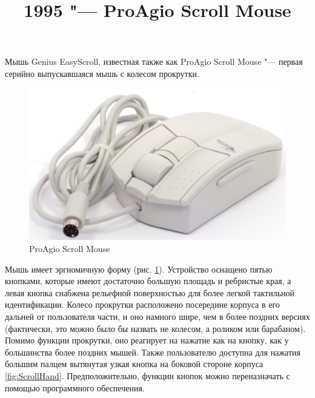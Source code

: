 \documentclass[11pt, a4paper]{article}
\begin{document}
\title{1995 "--- ProAgio Scroll Mouse}
\date{}
\maketitle

Мышь Genius EasyScroll, известная также как ProAgio Scroll Mouse "--- первая серийно выпускавшаяся мышь с колесом прокрутки.

\begin{figure}[h]
    \centering
    \includegraphics[scale=0.5]{1995_pro_agio_scroll_mouse/pic_30.jpg}
    \caption{ProAgio Scroll Mouse}
    \label{fig:ScrollPic}
\end{figure}


Мышь имеет эргномичную форму (рис. \ref{fig:ScrollPic}). Устройство оснащено пятью кнопками, которые имеют достаточно большую площадь и ребристые края, а левая кнопка снабжена рельефной поверхностью для более легкой тактильной идентификации. Колесо прокрутки расположено посередине корпуса в его дальней от пользователя части, и оно намного шире, чем в более поздних версиях (фактически, это можно было бы назвать не колесом, а роликом или барабаном). Помимо функции прокрутки, оно реагирует на нажатие как на кнопку, как у большинства более поздних мышей. Также пользователю доступна для нажатия большим палцем вытянутая узкая кнопка на боковой стороне корпуса \ref{fig:ScrollHand}. Предположительно, функции кнопок можно переназначать с помощью программного обеспечения.
\end{document}
